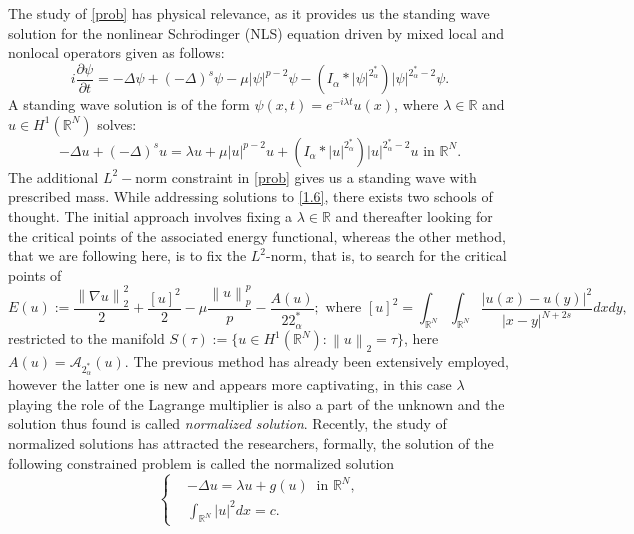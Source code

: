 \documentclass[11pt]{article}
\numberwithin{equation}{section}
\numberwithin{mytheorem}{section}
\begin{document}
	
	The study of \eqref{prob} has physical relevance, as it provides us the standing wave solution for the nonlinear Schr$\ddot{\text{o}}$dinger (NLS) equation driven by mixed local and nonlocal operators given as follows:
	\begin{equation}\label{Schrodinger_equation}
		i \frac{\partial \psi}{\partial t} = -\Delta \psi+(-\Delta)^s\psi -\mu |\psi|^{p-2} \psi -(I_{\alpha}*|\psi|^{2^*_{\alpha}})|\psi|^{2^*_{\alpha}-2}\psi.
	\end{equation}
	A standing wave solution is of the form $\psi(x,t)=e^{-i\lambda t} u(x)$, where $\lambda\in \mathbb{R}$ and $u\in H^1(\mathbb{R}^N)$ solves:
	\begin{equation}\label{1.6}
		-\Delta u +(-\Delta)^s u  =  \lambda u +\mu |u|^{p-2}u +(I_{\alpha}*|u|^{2^*_{\alpha}})|u|^{2^*_{\alpha}-2}u \text{ in } \mathbb{R}^N.
	\end{equation}
	The additional $L^2-$norm constraint in \eqref{prob} gives us a standing wave with prescribed mass.
	While addressing solutions to \eqref{1.6}, there exists two schools of thought. The initial approach involves fixing a $\lambda\in \mathbb{R}$ and thereafter looking for the critical points of the associated energy functional, whereas the other method, that we are following here, is to fix the $L^2$-norm, that is, to search for the critical points of
	$$E(u):=\frac{\left\| \nabla u \right\|_2^2}{2}+\frac{[u]^2}{2}-\mu \frac{\left\| u \right\|_p^p}{p}-\frac{A(u)}{22^*_{\alpha}}; \text{ where } [u]^2=\int_{\mathbb{R}^N}\int_{\mathbb{R}^N}\frac{|u(x)-u(y)|^2}{|x-y|^{N+2s}}dxdy,$$
	restricted to the manifold $S(\tau):=\{u\in H^1(\mathbb{R}^N): \left\| u \right\|_2=\tau\}$, here $A(u)=\mathcal{A}_{2^*_{\alpha}}(u)$. The previous method has already been extensively employed, however the latter one is new and appears more captivating, in this case $\lambda$ playing the role of the Lagrange multiplier is also a part of the unknown and the solution thus found is called {\it normalized solution}. Recently, the study of normalized solutions has attracted the researchers, formally, the solution of the following constrained problem is called the normalized solution
	\begin{equation}\label{Norm_sol}
		\left\{ \begin{array}{rl}   	
			& 	-\Delta u  =  \lambda u +g(u)\;\;\text{in } \mathbb{R}^N,\\
			&  	\int_{\mathbb{R}^N}|u|^2dx  =  c.
		\end{array}
		\right.
	\end{equation} 
\end{document}
